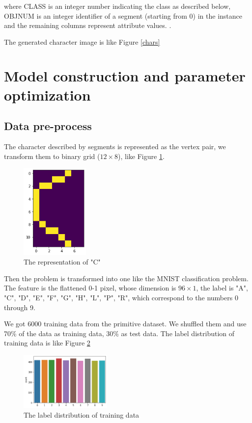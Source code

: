 \documentclass[11pt,en]{elegantpaper}
\begin{document}
where CLASS is an integer number indicating the class as described below, OBJNUM is an integer identifier of a segment (starting from 0) in the instance and the remaining columns represent attribute values. \cite{schapire1999improved}.

The generated character image is like Figure \ref{chars}


\section{Model construction and parameter optimization}
\subsection{Data pre-process}
The character described by segments is represented as the vertex pair, we transform them to binary grid ($12\times 8$), like Figure \ref{transform}.

\begin{figure}[h]
	\centering
	\includegraphics[width=0.3\textwidth]{image/C_array}
	\caption{The representation of "C"}
	\label{transform}
\end{figure}

Then the problem is transformed into one like the MNIST classification problem. The feature is the flattened 0-1 pixel, whose dimension is $96\times 1$, the label is "A", "C", "D", "E", "F", 
"G", "H", "L", "P", "R", which correspond to the numbers 0 through 9. 


We got 6000 training data from the primitive dataset. We shuffled them and use 70\% of the data as training data, 30\% as test data. The label distribution of training data is like Figure \ref{dist_y}
\begin{figure}[h]
	\centering
	\includegraphics[width=0.4\textwidth]{image/dis_y}
	\caption{The label distribution of training data}
	\label{dist_y}
\end{figure}
\end{document}
